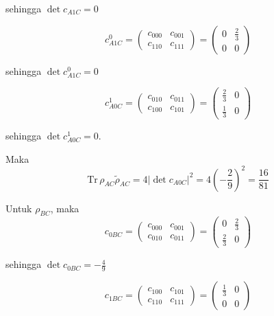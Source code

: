 sehingga $\det c_{A1C} = 0$

\begin{equation}
	c_{A1C}^0=
	\begin{pmatrix}
		c_{000} & c_{001} \\
		c_{110} & c_{111}
	\end{pmatrix}=
	\begin{pmatrix}
		0 & \frac{2}{3} \\
		0 & 0
	\end{pmatrix}
\end{equation}

sehingga $\det c_{A1C}^0 = 0$

\begin{equation}
	c_{A0C}^1=
	\begin{pmatrix}
		c_{010} & c_{011} \\
		c_{100} & c_{101}
	\end{pmatrix}=
	\begin{pmatrix}
		\frac{2}{3} & 0 \\
		\frac{1}{3} & 0
	\end{pmatrix}
\end{equation}

sehingga $\det c_{A0C}^1 = 0$.

Maka
\begin{equation}
	\mathrm{Tr}\,\rho_{AC}\tilde{\rho}_{AC}=4|\det c_{A0C}|^2=4(-\frac{2}{9})^2=\frac{16}{81}
\end{equation}

Untuk $\rho_{BC}$, maka
\begin{equation}
	c_{0BC}=
	\begin{pmatrix}
		c_{000} & c_{001} \\
		c_{010} & c_{011}
	\end{pmatrix}=
	\begin{pmatrix}
		0 & \frac{2}{3} \\
		\frac{2}{3} & 0
	\end{pmatrix}
\end{equation}

sehingga $\det c_{0BC} = -\frac{4}{9}$

\begin{equation}
	c_{1BC}=
	\begin{pmatrix}
		c_{100} & c_{101} \\
		c_{110} & c_{111}
	\end{pmatrix}=
	\begin{pmatrix}
		\frac{1}{3} & 0 \\
		0 & 0
	\end{pmatrix}
\end{equation}

